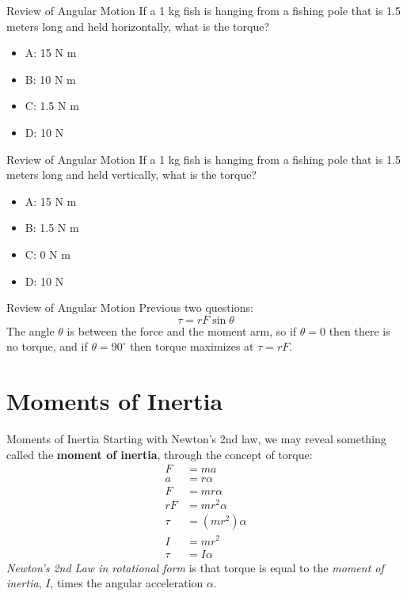 \documentclass{beamer}
\begin{document}
\begin{frame}{Review of Angular Motion}
If a 1 kg fish is hanging from a fishing pole that is 1.5 meters long and held horizontally, what is the torque?
\begin{itemize}
\item A: 15 N m
\item B: 10 N m
\item C: 1.5 N m
\item D: 10 N
\end{itemize}
\end{frame}

\begin{frame}{Review of Angular Motion}
If a 1 kg fish is hanging from a fishing pole that is 1.5 meters long and held vertically, what is the torque?
\begin{itemize}
\item A: 15 N m
\item B: 1.5 N m
\item C: 0 N m
\item D: 10 N
\end{itemize}
\end{frame}

\begin{frame}{Review of Angular Motion}
Previous two questions:
\begin{equation}
\tau = r F \sin\theta
\end{equation}
The angle $\theta$ is between the force and the moment arm, so if $\theta = 0$ then there is no torque, and if $\theta = 90^{\circ}$ then torque maximizes at $\tau = rF$.
\end{frame}

\section{Moments of Inertia}

\begin{frame}{Moments of Inertia}
Starting with Newton's 2nd law, we may reveal something called the \textbf{moment of inertia}, through the concept of torque:
\begin{align}
F &= ma \\
a &= r\alpha \\
F &= mr\alpha \\
rF &= mr^2\alpha \\
\tau &= (m r^2) \alpha \\
I &= mr^2 \\
\tau &= I \alpha
\end{align}
\textit{Newton's 2nd Law in rotational form} is that torque is equal to the \textit{moment of inertia}, $I$, times the angular acceleration $\alpha$.
\end{frame}
\end{document}
